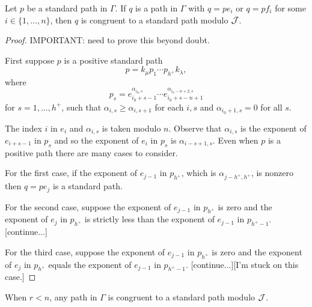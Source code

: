 \documentclass[a4paper, 11pt]{report}
\begin{document}
\begin{lemma}\label{lemma:extending-standard-paths}
Let $p$ be a standard path in $\Gamma$. If $q$ is a path in $\Gamma$ with $q=pe_i$ or $q=pf_i$ for some $i\in\{1,\ldots,n\}$, then $q$ is congruent to a standard path modulo $\mathcal{J}$.
\end{lemma}

\begin{proof}{\color{red}
IMPORTANT: need to prove this beyond doubt.
}

First suppose $p$ is a positive standard path
\begin{equation*}
p=k_\mu p_1\cdots p_{h^+}k_\lambda,
\end{equation*}
where
\begin{equation*}
p_s = e_{i_0 +s-1}^{\alpha_{i_0,s}}\cdots e_{i_0+s-n+1}^{\alpha_{i_0-n+2,s}}
\end{equation*}
for $s=1,\ldots,h^+$, such that $\alpha_{i,s}\geq \alpha_{i,s+1}$ for each $i,s$ and $\alpha_{i_0+1,s}=0$ for all $s$.

The index $i$ in $e_i$ and $\alpha_{i,s}$ is taken modulo $n$. Observe that $\alpha_{i,s}$ is the exponent of $e_{i+s-1}$ in $p_s$ and so the exponent of $e_i$ in $p_s$ is $\alpha_{i-s+1,s}$. Even when $p$ is a positive path there are many cases to consider.

For the first case, if the exponent of $e_{j-1}$ in $p_{h^+}$, which is $\alpha_{j-h^+,h^+}$, is nonzero then $q=pe_j$ is a standard path.

For the second case, suppose the exponent of $e_{j-1}$ in $p_{h^+}$ is zero and the exponent of $e_j$ in $p_{h^+}$ is strictly less than the exponent of $e_{j-1}$ in $p_{h^+-1}$. [continue...]

For the third case, suppose the exponent of $e_{j-1}$ in $p_{h^+}$ is zero and the exponent of $e_j$ in $p_{h^+}$ equals the exponent of $e_{j-1}$ in $p_{h^+-1}$. [continue...][I'm stuck on this case.]

\end{proof}

\begin{proposition}\label{proposition:std-paths-span-quiver-algebra}
When $r<n$, any path in $\Gamma$ is congruent to a standard path modulo $\mathcal{J}$.
\end{proposition}
\end{document}

